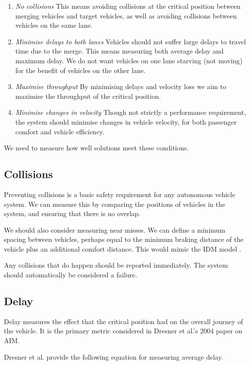 \begin{enumerate}
\item \textit{No collisions}
This means avoiding collisions at the critical position between merging vehicles and target vehicles, as well as avoiding collisions between vehicles on the same lane.
\item \textit{Minimise delays to both lanes}
Vehicles should not suffer large delays to travel time due to the merge. This means measuring both average delay and maximum delay. We do not want vehicles on one lane starving (not moving) for the benefit of vehicles on the other lane.
\item \textit{Maximise throughput}
By minimising delays and velocity loss we aim to maximise the throughput of the critical position.
\item \textit{Minimise changes in velocity}
Though not strictly a performance requirement, the system should minimise changes in vehicle velocity, for both passenger comfort and vehicle efficiency.
\end{enumerate}

We need to measure how well solutions meet these conditions. 

\subsection{Collisions}
\label{subsec:Collisions}
Preventing collisions is a basic safety requirement for any autonomous vehicle system. We can measure this by comparing the positions of vehicles in the system, and ensuring that there is no overlap.

We should also consider measuring near misses. We can define a minimum spacing between vehicles, perhaps equal to the minimum braking distance of the vehicle plus an additional comfort distance. This would mimic the IDM model \citep{Treiber2000}.

Any collisions that do happen should be reported immediately. The system should automatically be considered a failure.

\subsection{Delay}
\label{subsec:Delay}
Delay measures the effect that the critical position had on the overall journey of the vehicle. It is the primary metric considered in Dresner et al.'s 2004 paper \citep{Dresner2004} on AIM.

Dresner et al. provide the following equation for measuring average delay.


